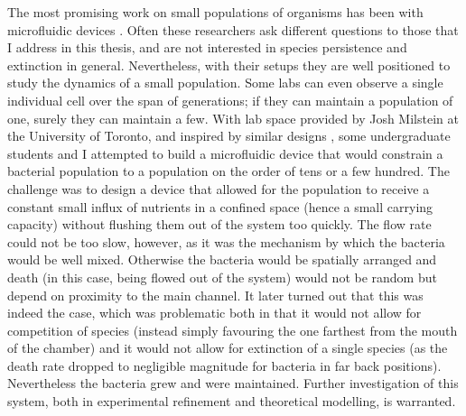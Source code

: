 The most promising work on small populations of organisms has been with microfluidic devices \cite{Wheeler2003,Wang2010,Grunberger2014}. 
Often these researchers ask different questions to those that I address in this thesis, and are not interested in species persistence and extinction in general. 
Nevertheless, with their setups they are well positioned to study the dynamics of a small population. 
Some labs can even observe a single individual cell over the span of generations; if they can maintain a population of one, surely they can maintain a few. 
%
With lab space provided by Josh Milstein at the University of Toronto, and inspired by similar designs \cite{Wheeler2003,Wang2010,Grunberger2014}, some undergraduate students and I attempted to build a microfluidic device that would constrain a bacterial population to a population on the order of tens or a few hundred. 
The challenge was to design a device that allowed for the population to receive a constant small influx of nutrients in a confined space (hence a small carrying capacity) without flushing them out of the system too quickly. 
The flow rate could not be too slow, however, as it was the mechanism by which the bacteria would be well mixed. 
Otherwise the bacteria would be spatially arranged and death (in this case, being flowed out of the system) would not be random but depend on proximity to the main channel. 
It later turned out that this was indeed the case, which was problematic both in that it would not allow for competition of species (instead simply favouring the one farthest from the mouth of the chamber) and it would not allow for extinction of a single species (as the death rate dropped to negligible magnitude for bacteria in far back positions). 
Nevertheless the bacteria grew and were maintained. 
Further investigation of this system, both in experimental refinement and theoretical modelling, is warranted. 

\iffalse
\begin{figure}
\centering
\texttt{[image: microfluidicDesign]}
\caption{words words and more words} \label{microfluidic} %
\end{figure}
\fi


